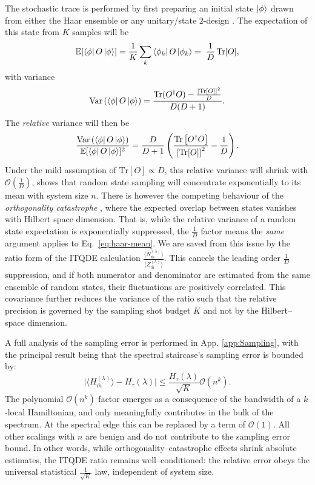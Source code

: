 \documentclass[reprint, aps,prx,showpacs,bibfootnote,preprintnumbers, mathtools, superscriptaddress, amsmath,amssymb]{revtex4-2}
\begin{document}
The stochastic trace is performed by first preparing an initial state $\ket{\phi}$ drawn from either the Haar ensemble or any unitary/state $2$-design \cite{PhysRevA.80.012304}. The expectation of this state from $K$ samples  will be
\begin{equation}
\label{eq:haar-mean}
\mathbb{E}[\bra{\phi}O\ket{\phi}]= \frac{1}{K}\sum_k\bra{\phi_k}O\ket{\phi_k}=\; \frac{1}{D}\,\mathrm{Tr}[O],
\end{equation}
with variance
\begin{equation}
\label{eq:haar-var}
\mathrm{Var}\left(\bra{\phi}O\ket{\phi}\right)
= \frac{ \mathrm{Tr}(O^\dagger O) - \frac{|\mathrm{Tr}[O]|^2}{D}}{D(D+1)}.
\end{equation}
The \textit{relative} variance will then be
\begin{equation}
\label{eq:haar-var-rel}
\frac{\mathrm{Var}\left(\bra{\phi}O\ket{\phi}\right)}{\mathbb{E}[\bra{\phi}O\ket{\phi}]^2} =\frac{D}{D+1}
 \left(\frac{\mathrm{Tr}\left[O^\dagger O\right]}{\left[\mathrm{Tr}[O]\right]^2}-\frac{1}{D}\right).
\end{equation}
Under the mild assumption of $\mathrm{Tr}[O] \propto D$, this relative variance will shrink with $\mathcal{O}(\frac{1}{D})$,  shows that random state sampling will concentrate exponentially to its mean with system size $n$. There is however the competing behaviour of the \textit{orthogonality catastrophe} \cite{PhysRevLett.18.1049}, where the expected overlap between states vanishes with Hilbert space dimension. That is, while the relative variance of a random state expectation is exponentially suppressed, the $\frac{1}{D}$ factor means the \textit{same} argument applies to Eq.~\eqref{eq:haar-mean}. We are saved from this issue by the ratio form of the ITQDE calculation $\frac{\langle N^{(\lambda)}_{\bar{m}}\rangle}{ \langle Z^{(\lambda)}_{\bar{m}}\rangle}$. This cancels the leading order $\frac{1}{D}$ suppression, and if both numerator and denominator are estimated from the same ensemble of random states, their fluctuations are positively correlated. This covariance further reduces the variance of the ratio \cite{PhysRevLett.125.200501}  such that the relative precision is governed by the sampling shot budget $K$ and not by the Hilbert–space dimension.

A full analysis of the sampling error is performed in  App. \ref{app:Sampling}, with the principal result being that the spectral staircase's sampling error is bounded by:
\begin{equation}
\label{eq:minimal-bound-sampling}
\big|\langle H_{\bar m}^{(\lambda)}\rangle -H_\tau(\lambda) \big| \le \frac{H_\tau(\lambda)}{\sqrt{K}}\mathcal{O}(n^k).
\end{equation}
The polynomial $\mathcal{O}(n^k)$ factor emerges as a consequence of the bandwidth of a $k$-local Hamiltonian, and only meaningfully contributes in the bulk of the spectrum. At the spectral edge this can be replaced by a term of $\mathcal{O}(1)$. All other scalings with $n$ are benign and do not contribute to the sampling error bound.  In other words, while orthogonality–catastrophe effects shrink absolute estimates, the ITQDE ratio remains well–conditioned: the relative error obeys the universal statistical $\frac{1}{\sqrt{K}}$ law, independent of system size.
\end{document}
